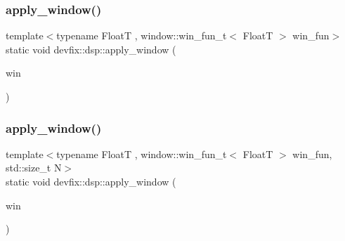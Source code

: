 \mbox{\label{namespacedevfix_1_1dsp_a299d793e30216ab3dc270c45fc1a1611}} 
\subsubsection{\texorpdfstring{apply\+\_\+window()}{apply\_window()}\hspace{0.1cm}{\footnotesize\ttfamily [2/6]}}
{\footnotesize\ttfamily template$<$typename FloatT , window\+::win\+\_\+fun\+\_\+t$<$ Float\+T $>$ win\+\_\+fun$>$ \\
static void devfix\+::dsp\+::apply\+\_\+window (\begin{DoxyParamCaption}\item[{std\+::vector$<$ std\+::complex$<$ FloatT $>$$>$ \&}]{win }\end{DoxyParamCaption})\hspace{0.3cm}{\ttfamily [static]}}

\mbox{\label{namespacedevfix_1_1dsp_a2843d1ef6aea33bdd37a84657b228414}} 
\subsubsection{\texorpdfstring{apply\+\_\+window()}{apply\_window()}\hspace{0.1cm}{\footnotesize\ttfamily [3/6]}}
{\footnotesize\ttfamily template$<$typename FloatT , window\+::win\+\_\+fun\+\_\+t$<$ Float\+T $>$ win\+\_\+fun, std\+::size\+\_\+t N$>$ \\
static void devfix\+::dsp\+::apply\+\_\+window (\begin{DoxyParamCaption}\item[{std\+::array$<$ std\+::complex$<$ FloatT $>$, N $>$ \&}]{win }\end{DoxyParamCaption})\hspace{0.3cm}{\ttfamily [static]}}

\mbox{\label{namespacedevfix_1_1dsp_a400e0dd8341bfbcfe42e60388c7a2494}} 

